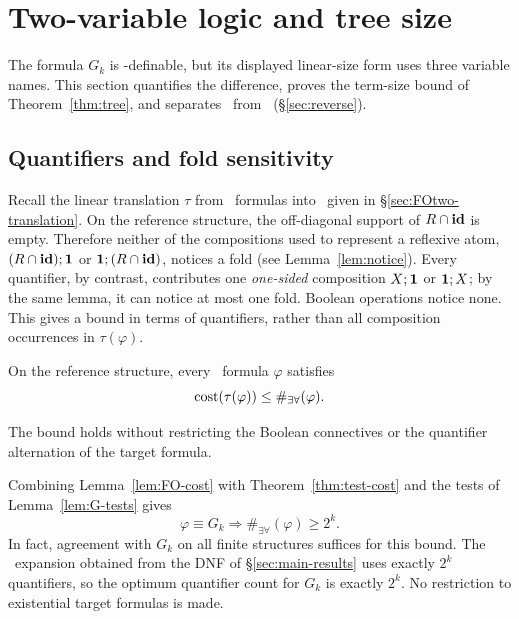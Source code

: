\section{Two-variable logic and tree size}\label{sec:FOtwo}
The formula $G_k$ is \FOtwo-definable, but its displayed linear-size
form uses three variable names. This section quantifies the difference,
proves the term-size bound of Theorem~\ref{thm:tree}, and separates
\CoR\ from \FOtwo\ (\S\ref{sec:reverse}).

\subsection{Quantifiers and fold sensitivity}\label{sec:quantifier-cost}
Recall the linear translation $\tau$ from \FOtwo\ formulas into \CoR\
given in \S\ref{sec:FOtwo-translation}. On the reference structure,
the off-diagonal support of $R\cap\mathbf{id}$ is empty. Therefore neither
of the compositions used to represent a reflexive atom,
$(R\cap\mathbf{id});\mathbf{1}$ or $\mathbf{1};(R\cap\mathbf{id})$, notices a fold
(see Lemma~\ref{lem:notice}). Every quantifier, by contrast, contributes
one \emph{one-sided} composition $X;\mathbf{1}$ or $\mathbf{1};X$; by the same
lemma, it can notice at most one fold. Boolean operations notice none.
This gives a bound in terms of quantifiers, rather than all
composition occurrences in $\tau(\varphi)$.
\begin{lemma}\label{lem:FO-cost}
On the reference structure, every \FOtwo\ formula $\varphi$ satisfies
\[
 \operatorname{cost}(\tau(\varphi))\le \#_{\exists\forall}(\varphi).
\]
\end{lemma}
The bound holds without restricting the Boolean connectives or the
quantifier alternation of the target formula.

Combining Lemma~\ref{lem:FO-cost} with Theorem~\ref{thm:test-cost} and
the tests of Lemma~\ref{lem:G-tests} gives
\[
 \varphi\equiv G_k\Longrightarrow \#_{\exists\forall}(\varphi)\ge2^k.
\]
In fact, agreement with $G_k$ on all finite structures suffices for
this bound. The \FOtwo\ expansion obtained from the DNF of \S\ref{sec:main-results}
uses exactly $2^k$ quantifiers, so the optimum quantifier count for
$G_k$ is exactly $2^k$. No restriction to existential target formulas is
made.

